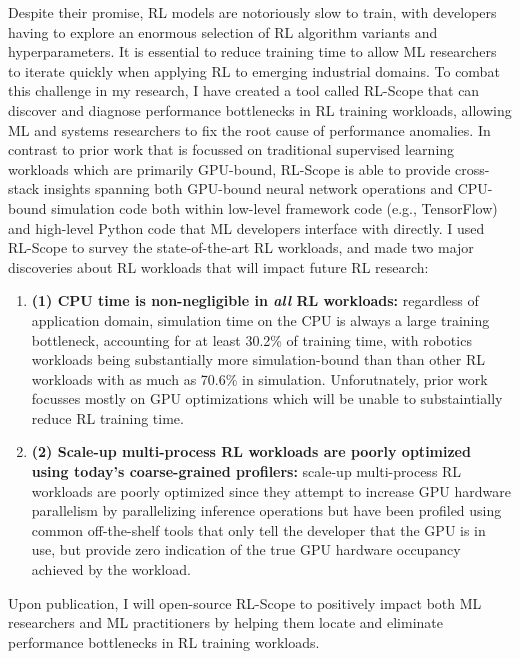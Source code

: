 \documentclass[letterpaper,11pt]{article}
\begin{document}
Despite their promise, RL models are notoriously slow to train, with developers having to explore an enormous selection of RL algorithm variants and hyperparameters.  It is essential to reduce training time to allow ML researchers to iterate quickly when applying RL to emerging industrial domains.  To combat this challenge in my research, I have created a tool called RL-Scope that can discover and diagnose performance bottlenecks in RL training workloads, allowing ML and systems researchers to fix the root cause of performance anomalies.
%
In contrast to prior work that is focussed on traditional supervised learning workloads which are primarily GPU-bound, RL-Scope is able to provide cross-stack insights spanning both GPU-bound neural network operations and CPU-bound simulation code both within low-level framework code (e.g., TensorFlow) and high-level Python code that ML developers interface with directly.
%
I used RL-Scope to survey the state-of-the-art RL workloads, and made two major discoveries about RL workloads that will impact future RL research:
\begin{enumerate}
	\item \textbf{(1) CPU time is non-negligible in \textit{all} RL workloads:} regardless of application domain, simulation time on the CPU is always a large training bottleneck, accounting for at least 30.2\% of training time, with robotics workloads being substantially more simulation-bound than than other RL workloads with as much as 70.6\% in simulation.  Unforutnately, prior work focusses mostly on GPU optimizations which will be unable to substaintially reduce RL training time.
%
	\item \textbf{(2) Scale-up multi-process RL workloads are poorly optimized using today's coarse-grained profilers:}
	scale-up multi-process RL workloads are poorly optimized since they attempt to increase GPU hardware parallelism by parallelizing inference operations but have been profiled using common off-the-shelf tools that only tell the developer that the GPU is in use, but provide zero indication of the true GPU hardware occupancy achieved by the workload.
\end{enumerate}
%
Upon publication, I will open-source RL-Scope to positively impact both ML researchers and ML practitioners by helping them locate and eliminate performance bottlenecks in RL training workloads.
\end{document}
